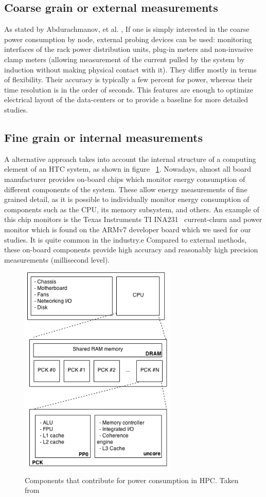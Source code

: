 \subsection*{Coarse grain or external measurements}
As stated by Abdurachmanov, et al. \cite{ACAT}, If one is simply interested in the coarse power consumption by node,
external probing devices can be used: monitoring interfaces
of the rack power distribution units, plug-in meters and non-invasive
clamp meters (allowing measurement of the
current pulled by the system by induction without making physical
contact with it). They differ mostly in terms of flexibility.
Their accuracy is typically a few percent for power, whereas their time
resolution is in the order of seconds. This features are enough
to optimize electrical layout of the data-centers or to provide a
baseline for more detailed studies.

\subsection*{Fine grain or internal measurements}
A alternative approach takes into account the internal structure of a
computing element of an HTC system, as shown in figure 
~\ref{fig:power-consumption-model}. Nowadays, almost all board manufacturer
provides on-board chips which monitor energy consumption of
different components of the system. These
allow energy measurements of fine grained detail, as it is possible
to individually monitor energy consumption of components such as
the CPU, its memory subsystem, and others. An example of this chip
monitors is the Texas Instruments TI INA231~\cite{TIINA231} current-churn
and power monitor which is found on the ARMv7 developer board which
we used for our studies. It is quite common in the industry.e
Compared to external methods, these on-board components provide
high accuracy and reasonably high precision measurements (millisecond
level).

\begin{figure}[tbp]
\centering
\includegraphics[width=75mm]{img/energy_model.png}
\caption{Components that contribute for power consumption in HPC. Taken from \cite{ACAT}}
\label{fig:power-consumption-model}
\end{figure}

